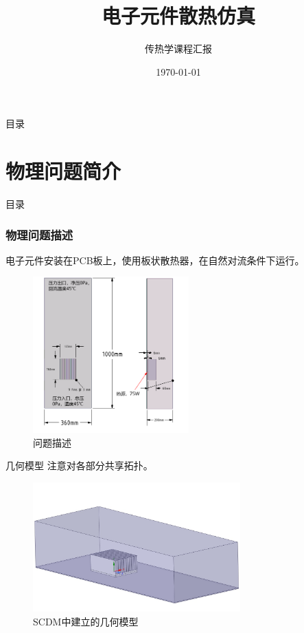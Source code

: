 \documentclass[UTF8,9pt]{ctexbeamer}
\begin{document}
\title{{电子元件散热仿真}\\\vspace{1em}}

\subtitle{传热学课程汇报}

\author{}

\institute{}

\date{\today}

\frame{\titlepage}

\begin{frame}{目录}

\tableofcontents

\end{frame}

\section{物理问题简介}

\begin{frame}{目录}

\tableofcontents[currentsection]

\end{frame}

\begin{frame}

\frametitle{物理问题描述}
%
电子元件安装在PCB板上，使用板状散热器，在自然对流条件下运行。
\\

\begin{figure}
    \includegraphics[height=6cm]{figure2.png}
    \caption{问题描述}
\end{figure}
%

%
\end{frame}
\begin{frame}{几何模型}
	注意对各部分共享拓扑。
	\vfill
	\begin{figure}
		\includegraphics[width=8cm]{figure1.jpg}
		\caption{SCDM中建立的几何模型}
	\end{figure}	
\end{frame}
\end{document}
